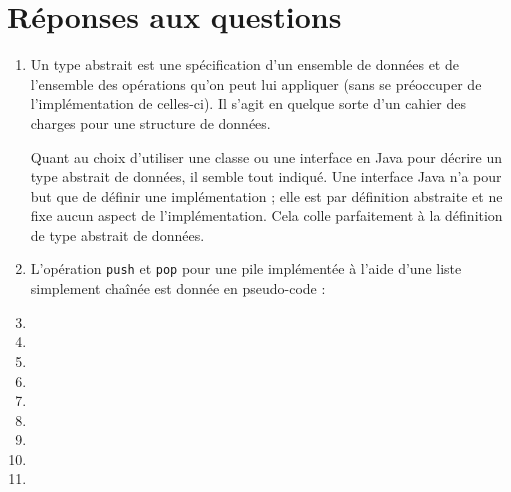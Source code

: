 

\section{Réponses aux questions}
\begin{enumerate}
	\item Un type abstrait est une spécification
	d'un ensemble de données et de l'ensemble des
	opérations qu'on peut lui appliquer (sans se
	préoccuper de l'implémentation de celles-ci).
	Il s'agit en quelque sorte d'un cahier des
	charges pour une structure de données.
	\cite{wiki-tad}\cite{mod-obj}
	
	Quant au choix d'utiliser une classe ou une
	interface en Java pour décrire un type abstrait
	de données, il semble tout indiqué. Une interface
	Java n'a pour but que de définir une implémentation ;
	elle est par définition abstraite et ne fixe aucun
	aspect de l'implémentation.\cite{nino} Cela colle
	parfaitement à la définition de type abstrait de
	données.
	\item L'opération \lstinline{push} et \lstinline{pop}
	pour une pile implémentée à l'aide d'une liste simplement
	chaînée est donnée en pseudo-code :
	
	\begin{algorithm}
		
	\end{algorithm}

	\begin{algorithm}
		
	\end{algorithm}

	\item
	\item
	\item
	\item
	\item
	\item
	\item
	\item
	\item
\end{enumerate}




